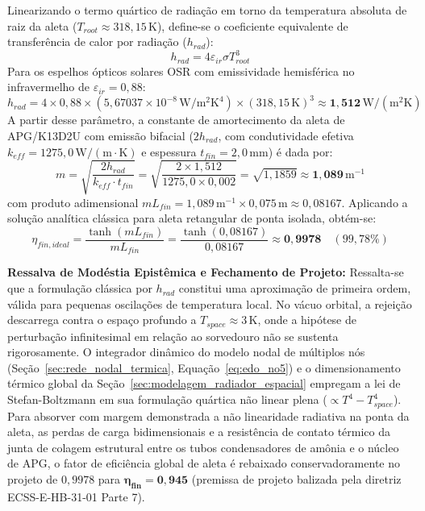 Linearizando o termo quártico de radiação em torno da temperatura absoluta de raiz da aleta ($T_{root} \approx 318{,}15\,\mathrm{K}$), define-se o coeficiente equivalente de transferência de calor por radiação ($h_{rad}$):
\begin{equation}
    h_{rad} = 4 \varepsilon_{ir} \sigma T_{root}^3
    \label{eq:hrad_def_blindada}
\end{equation}
Para os espelhos ópticos solares OSR com emissividade hemisférica no infravermelho de $\varepsilon_{ir} = 0{,}88$:
\begin{equation}
    h_{rad} = 4 \times 0{,}88 \times (5{,}67037 \times 10^{-8}\,\mathrm{W/m^2K^4}) \times (318{,}15\,\mathrm{K})^3 \approx \mathbf{1{,}512\,\mathrm{W/(m^2K)}}
\end{equation}
A partir desse parâmetro, a constante de amortecimento da aleta de APG/K13D2U com emissão bifacial ($2 h_{rad}$, com condutividade efetiva $k_{eff} = 1275{,}0\,\mathrm{W/(m\cdot K)}$ e espessura $t_{fin} = 2{,}0\,\mathrm{mm}$) é dada por:
\begin{equation}
    m = \sqrt{\frac{2 h_{rad}}{k_{eff} \cdot t_{fin}}} = \sqrt{\frac{2 \times 1{,}512}{1275{,}0 \times 0{,}002}} = \sqrt{1{,}1859} \approx \mathbf{1{,}089\,\mathrm{m^{-1}}}
\end{equation}
com produto adimensional $m L_{fin} = 1{,}089\,\mathrm{m^{-1}} \times 0{,}075\,\mathrm{m} \approx 0{,}08167$. Aplicando a solução analítica clássica para aleta retangular de ponta isolada, obtém-se:
\begin{equation}
    \eta_{fin,ideal} = \frac{\tanh(m L_{fin})}{m L_{fin}} = \frac{\tanh(0{,}08167)}{0{,}08167} \approx \mathbf{0{,}9978} \quad (99{,}78\%)
    \label{eq:eta_fin_ideal_fechado}
\end{equation}

\noindent\textbf{Ressalva de Modéstia Epistêmica e Fechamento de Projeto:} Ressalta-se que a formulação clássica por $h_{rad}$ constitui uma aproximação de primeira ordem, válida para pequenas oscilações de temperatura local. No vácuo orbital, a rejeição descarrega contra o espaço profundo a $T_{space} \approx 3\,\mathrm{K}$, onde a hipótese de perturbação infinitesimal em relação ao sorvedouro não se sustenta rigorosamente. O integrador dinâmico do modelo nodal de múltiplos nós (Seção~\ref{sec:rede_nodal_termica}, Equação~\ref{eq:edo_no5}) e o dimensionamento térmico global da Seção~\ref{sec:modelagem_radiador_espacial} empregam a lei de Stefan-Boltzmann em sua formulação quártica não linear plena ($\propto T^4 - T_{space}^4$). Para absorver com margem demonstrada a não linearidade radiativa na ponta da aleta, as perdas de carga bidimensionais e a resistência de contato térmico da junta de colagem estrutural entre os tubos condensadores de amônia e o núcleo de APG, o fator de eficiência global de aleta é rebaixado conservadoramente no projeto de $0{,}9978$ para $\boldsymbol{\eta_{fin} = 0{,}945}$ (premissa de projeto balizada pela diretriz ECSS-E-HB-31-01 Parte 7).

